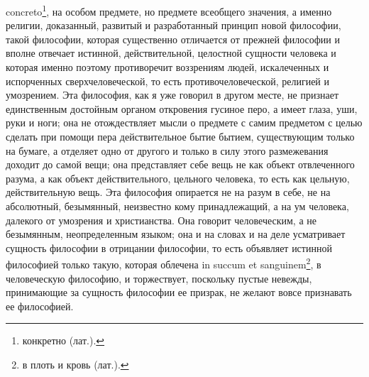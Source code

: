 \documentclass[12pt,oneside]{book}
\begin{document}
concreto\footnote{конкретно (лат.).}, на особом предмете, но предмете всеобщего значения, а именно религии, доказанный, развитый и разработанный принцип новой философии, такой философии, которая существенно отличается от прежней философии и вполне отвечает истинной, действительной, целостной сущности человека и которая именно поэтому противоречит воззрениям людей, искалеченных и испорченных сверхчеловеческой, то есть противочеловеческой, религией и умозрением. Эта философия, как я уже говорил в другом месте, не признает единственным достойным органом откровения гусиное перо, а имеет глаза, уши, руки и ноги; она не отождествляет мысли о предмете с самим предметом с целью сделать при помощи пера действительное бытие бытием, существующим только на бумаге, а отделяет одно от другого и только в силу этого размежевания доходит до самой вещи; она представляет себе вещь не как объект отвлеченного разума, а как объект действительного, цельного человека, то есть как цельную, действительную вещь. Эта философия опирается не на разум в себе, не на абсолютный, безымянный, неизвестно кому принадлежащий, а на ум человека, далекого от умозрения и христианства. Она говорит человеческим, а не безымянным, неопределенным языком; она и на словах и на деле усматривает сущность философии в отрицании философии, то есть объявляет истинной философией только такую, которая облечена in succum et sanguinem\footnote{в плоть и кровь (лат.).}, в человеческую философию, и торжествует, поскольку пустые невежды, принимающие за сущность философии ее призрак, не желают вовсе признавать ее философией.
\end{document}
